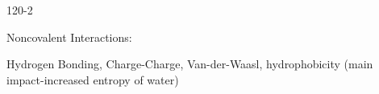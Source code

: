 \begin{mitframe}{120-2}
        
 \begin{listone}
	\item Noncovalent Interactions: 
    \begin{listtwo}
		\item Hydrogen Bonding, Charge-Charge, Van-der-Waasl, hydrophobicity (main impact-increased entropy of water)
	\end{listtwo}
\end{listone}
\end{mitframe}